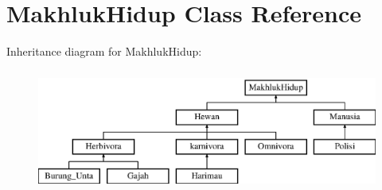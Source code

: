 \hypertarget{class_makhluk_hidup}{}\section{Makhluk\+Hidup Class Reference}
\label{class_makhluk_hidup}
Inheritance diagram for Makhluk\+Hidup\+:\begin{figure}[H]
\begin{center}
\leavevmode
\includegraphics[height=4.000000cm]{class_makhluk_hidup}
\end{center}
\end{figure}
